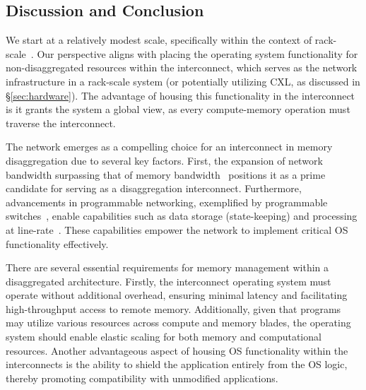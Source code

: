 \subsection{Discussion and Conclusion}
\begin{comment}

\begin{figure*}[t]
    \centering
    \subfigure[MIND architecture]{
      \texttt{[image: fig/mind.pdf]}
      \label{fig:mind}}
    \subfigure[MIND dataflow]{
      \texttt{[image: fig/mindflow.pdf]}
    \label{fig:mindflow}}\vspace{-1.0em}
      \caption{\textbf{MIND overview} (a) Each CXL server is equipped with two A1000 memory expansion cards. (b) Our platform comprises two CXL servers and one baseline server. The baseline server replicates the same configuration but lacks any CXL memory cards.}\vspace{-1.0em}
\end{figure*}
    
\end{comment}
We start at a relatively modest scale, specifically within the context of rack-scale~\cite{industry2, industry4}. Our perspective aligns with placing the operating system functionality for non-disaggregated resources within the interconnect, which serves as the network infrastructure in a rack-scale system (or potentially utilizing CXL, as discussed in \S\ref{sec:hardware}). The advantage of housing this functionality in the interconnect is it grants the system a global view, as every compute-memory operation must traverse the interconnect.


The network emerges as a compelling choice for an interconnect in memory disaggregation due to several key factors. First, the expansion of network bandwidth surpassing that of memory bandwidth~\cite{terabitethernet} positions it as a prime candidate for serving as a disaggregation interconnect. Furthermore, advancements in programmable networking, exemplified by programmable switches~\cite{progswitch1,progswitch2,progswitch3, progswitch4}, enable capabilities such as data storage (state-keeping) and processing at line-rate~\cite{pktsched}. These capabilities empower the network to implement critical OS functionality effectively.


There are several essential requirements for memory management within a disaggregated architecture. Firstly, the interconnect operating system must operate without additional overhead, ensuring minimal latency and facilitating high-throughput access to remote memory. Additionally, given that programs may utilize various resources across compute and memory blades, the operating system should enable elastic scaling for both memory and computational resources. Another advantageous aspect of housing OS functionality within the interconnects is the ability to shield the application entirely from the OS logic, thereby promoting compatibility with unmodified applications.

